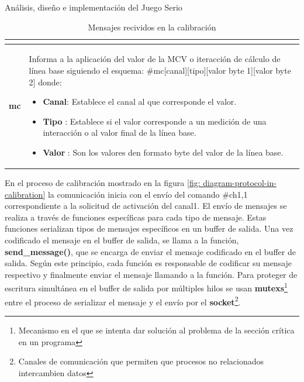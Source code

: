 \begin{thesischapter}{2} {Análisis, diseño e implementación del Juego Serio}
\begin{table}[ht]
\begin{tabular}{ |c|p{14cm}|}
\begin{minipage}{14cm}
\begin{itemize}
                                \end{itemize}
                                \vspace{1pt}
                            \end{minipage}\\\hline 
        \textbf{mc}     &   \begin{minipage}{14cm}
                                \vspace{1pt}
                                Informa a la aplicación del valor de la MCV o iteracción de cálculo de línea base siguiendo el esquema: \#mc[canal][tipo][valor byte 1][valor byte 2] donde:
                                \begin{itemize}
                                    \item \textbf{Canal}: Establece el canal al que corresponde el valor.
                                    \item \textbf{Tipo} : Establece si el valor corresponde a un medición de una interacción o al valor final de la línea base.
                                    \item \textbf{Valor} : Son los valores den formato byte del valor de la línea base.  
                                \end{itemize}
                                \vspace{1pt}
                            \end{minipage} \\\hline                        
    \end{tabular}
    \caption{Mensajes recividos en la calibración}
    \label{table:recive-msg-in-calibration}
\end{table} 


\newpage
{}
En el proceso de calibración mostrado en la figura \ref{fig: diagram-protocol-in-calibration}  la comunicación inicia con el envío del comando \#ch1,1 correspondiente a la solicitud de activación  del canal1. El envío de mensajes se realiza  a través de funciones específicas para cada tipo de mensaje. Estas funciones serializan tipos de mensajes específicos en un buffer de salida. Una vez codificado el mensaje en el buffer de salida, se llama a la función, \textbf{send\_message()}, que se encarga de enviar el mensaje codificado en el buffer de salida. Según este principio, cada función es responsable de codificar su mensaje respectivo y finalmente enviar el mensaje llamando a la función. Para proteger de escritura simultánea en el buffer de salida por múltiples hilos se usan \textbf{mutexs}\footnote{Mecanismo en el que se intenta dar solución al problema de la sección crítica en un programa} entre el
proceso de serializar el mensaje y el envío por el {\textbf{socket}}\footnote{Canales de comunicación que permiten que procesos no relacionados intercambien datos}. 
    

\end{thesischapter}
